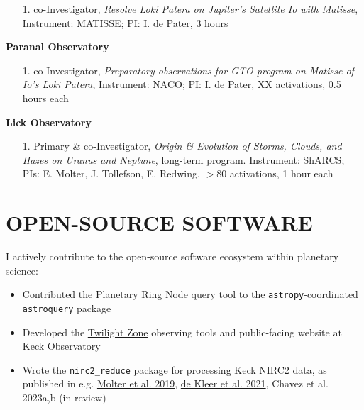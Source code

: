 \documentclass[margin, 10pt]{res} %
\begin{document}
\begin{resume}
\begin{enumerate}
	\item[1.] co-Investigator, {\it Resolve Loki Patera on Jupiter’s Satellite Io with Matisse}, Instrument: MATISSE; PI: I. de Pater, 3 hours %
\end{enumerate}
\vspace{-0.3cm}
\textbf{Paranal Observatory}
\begin{enumerate}
	\item[1.] co-Investigator, {\it Preparatory observations for GTO program on Matisse of Io's Loki Patera}, Instrument: NACO; PI: I. de Pater, XX activations, 0.5 hours each %
\end{enumerate}
\vspace{-0.3cm}
\textbf{Lick Observatory} 
\begin{enumerate}
	\item[1.] Primary \& co-Investigator, {\it Origin \& Evolution of Storms, Clouds, and Hazes on Uranus and Neptune}, long-term program. Instrument: ShARCS; PIs: E. Molter, J. Tollefson, E. Redwing. $>$80 activations, 1 hour each %
\end{enumerate}



\section{OPEN-SOURCE SOFTWARE}

I actively contribute to the open-source software ecosystem within planetary science:

\begin{itemize}

\item Contributed the \href{https://github.com/astropy/astroquery/tree/main/astroquery/solarsystem/pds}{Planetary Ring Node query tool} to the \texttt{astropy}-coordinated \texttt{astroquery} package

\item Developed the \href{https://www2.keck.hawaii.edu/inst/tda/TwilightZone.html#}{Twilight Zone} observing tools and public-facing website at Keck Observatory

\item Wrote the \href{https://github.com/emolter/nirc2_reduce}{\texttt{nirc2\_reduce} package} for processing Keck NIRC2 data, as published in e.g. \href{https://doi.org/10.1016/j.icarus.2018.11.018}{Molter et al. 2019}, \href{https://doi.org/10.3847/1538-3881/ab2380}{de Kleer et al. 2021}, Chavez et al. 2023a,b (in review)


\end{itemize}
\end{resume}
\end{document}
